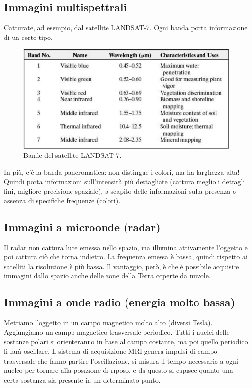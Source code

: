 \documentclass[a4paper,11pt]{article}
\begin{document}
\subsection{Immagini multispettrali}
Catturate, ad esempio, dal satellite LANDSAT-7. Ogni banda porta informazione di un certo tipo.

\renewcommand{\thefigure}{1.3}
\begin{figure}[!h]
  \centering
    \includegraphics[scale=0.7]{images/1/satellite_bands.png}
    \caption{Bande del satellite LANDSAT-7.}
\end{figure}

In più, c'è la banda pancromatica: non distingue i colori, ma ha larghezza alta! Quindi porta informazioni sull'intensità più dettagliate (cattura meglio i dettagli fini, migliore
precisione spaziale), a scapito delle informazioni sulla presenza o assenza di specifiche frequenze (colori).

\subsection{Immagini a microonde (radar)}
Il radar non cattura luce emessa nello spazio, ma illumina attivamente l'oggetto e poi cattura ciò che torna indietro. La frequenza emessa è bassa, quindi rispetto ai satelliti la risoluzione
è più bassa. Il vantaggio, però, è che è possibile acquisire immagini dallo spazio anche delle zone della Terra coperte da nuvole.

\subsection{Immagini a onde radio (energia molto bassa)}
Mettiamo l'oggetto in un campo magnetico molto alto (diversi Tesla). Aggiungiamo un campo magnetico trasversale periodico. Tutti i nuclei delle sostanze polari si orienteranno
in base al campo costante, ma poi quello periodico li farà oscillare.
Il sistema di acquisizione MRI genera impulsi di campo trasversale che fanno partire
l'oscillazione, si misura il tempo necessario a ogni nucleo per tornare alla posizione di riposo, e da questo si capisce quanto una certa sostanza sia presente in un determinato punto.
\end{document}

